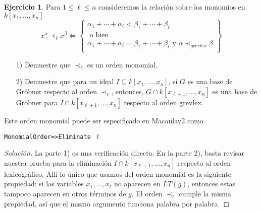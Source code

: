 \documentclass{article}
\theoremstyle{definition}
\newtheorem{ejerc}{Ejercicio}
\newenvironment{solucion}{\begin{proof}[Solución]}{\end{proof}}
\begin{document}
\begin{ejerc}
  Para $1 \le \ell \le n$ consideremos la relación sobre los monomios en
  $k [x_1,\ldots,x_n]$
  $$x^\alpha \prec_\ell x^\beta \iff \left\{\begin{array}{c}
\alpha_1+\cdots+\alpha_\ell < \beta_1+\cdots+\beta_\ell \\
\text{ o bien }\\
\alpha_1+\cdots+\alpha_\ell = \beta_1+\cdots+\beta_\ell \text{ y } \alpha\prec_{grevlex} \beta \\
\end{array}\right\}$$

  \begin{enumerate}
  \item[1)] Demuestre que $\prec_\ell$ es un orden monomial.

  \item[2)] Demuestre que para un ideal $I \subseteq k [x_1,\ldots,x_n]$, si $G$
    es una base de Gröbner respecto al orden $\prec_\ell$, entonces,
    $G \cap k [x_{\ell+1},\ldots,x_n]$ es una base de Gröbner para
    $I \cap k [x_{\ell+1},\ldots,x_n]$ respecto al orden grevlex.
  \end{enumerate}

  Este orden monomial puede ser especificado en Macaulay2 como
  \begin{center}
    \texttt{MonomialOrder=>Eliminate $\ell$}
  \end{center}

  \ifdefined\solutions\begin{solucion}
    La parte 1) es una verificación directa. En la parte 2), basta revisar
    nuestra prueba para la eliminación ${I \cap k [x_{\ell+1},\ldots,x_n]}$
    respecto al orden lexicográfico. Allí lo único que usamos del orden monomial
    es la siguiente propiedad: si las variables $x_1,\ldots,x_\ell$ no aparecen
    en $LT (g)$, entonces estas tampoco aparecen en otros términos de $g$. El
    orden $\prec_\ell$ cumple la misma propiedad, así que el mismo argumento
    funciona palabra por palabra.
  \end{solucion}\fi
\end{ejerc}
\end{document}
